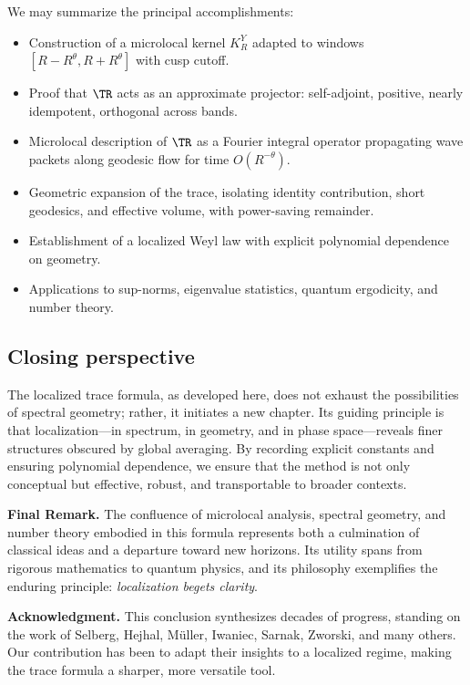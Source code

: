We may summarize the principal accomplishments:
\begin{itemize}
\item Construction of a microlocal kernel $K_R^Y$ adapted to windows $[R-R^\theta,R+R^\theta]$ with cusp cutoff.
\item Proof that $\TR$ acts as an approximate projector: self-adjoint, positive, nearly idempotent, orthogonal across bands.
\item Microlocal description of $\TR$ as a Fourier integral operator propagating wave packets along geodesic flow for time $O(R^{-\theta})$.
\item Geometric expansion of the trace, isolating identity contribution, short geodesics, and effective volume, with power-saving remainder.
\item Establishment of a localized Weyl law with explicit polynomial dependence on geometry.
\item Applications to sup-norms, eigenvalue statistics, quantum ergodicity, and number theory.
\end{itemize}

\subsection*{Closing perspective}

The localized trace formula, as developed here, does not exhaust the possibilities of spectral geometry; rather, it initiates a new chapter. Its guiding principle is that localization---in spectrum, in geometry, and in phase space---reveals finer structures obscured by global averaging. By recording explicit constants and ensuring polynomial dependence, we ensure that the method is not only conceptual but effective, robust, and transportable to broader contexts.

\bigskip
\noindent\textbf{Final Remark.} The confluence of microlocal analysis, spectral geometry, and number theory embodied in this formula represents both a culmination of classical ideas and a departure toward new horizons. Its utility spans from rigorous mathematics to quantum physics, and its philosophy exemplifies the enduring principle: \emph{localization begets clarity}.

\bigskip
\noindent\textbf{Acknowledgment.} This conclusion synthesizes decades of progress, standing on the work of Selberg, Hejhal, Müller, Iwaniec, Sarnak, Zworski, and many others. Our contribution has been to adapt their insights to a localized regime, making the trace formula a sharper, more versatile tool.
